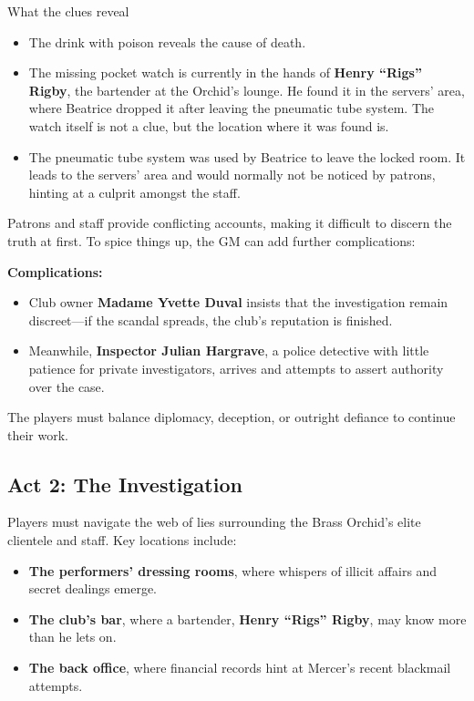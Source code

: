 \begin{DndComment}{What the clues reveal}
	\begin{itemize}
		\item The drink with poison reveals the cause of death.
		\item The missing pocket watch is currently in the hands of \textbf{Henry ``Rigs'' Rigby}, the bartender at the Orchid's lounge. He found it in the servers' area, where Beatrice dropped it after leaving the pneumatic tube system. The watch itself is not a clue, but the location where it was found is.
		\item The pneumatic tube system was used by Beatrice to leave the locked room. It leads to the servers' area and would normally not be noticed by patrons, hinting at a culprit amongst the staff.
	\end{itemize}
\end{DndComment}


Patrons and staff provide conflicting accounts, making it difficult to discern the truth at first. To spice things up, the GM can add further complications:
\begin{DndReadAloud}{\textbf{Complications:}}
	\begin{itemize}
		\item Club owner \textbf{Madame Yvette Duval} insists that the investigation remain discreet—if the scandal spreads, the club’s reputation is finished. 
		\item Meanwhile, \textbf{Inspector Julian Hargrave}, a police detective with little patience for private investigators, arrives and attempts to assert authority over the case.
	\end{itemize}
	
	\noindent
	The players must balance diplomacy, deception, or outright defiance to continue their work.
\end{DndReadAloud}



\subsection{Act 2: The Investigation} 

Players must navigate the web of lies surrounding the Brass Orchid’s elite clientele and staff. Key locations include:
\begin{DndReadAloud}{}
	\begin{itemize}
		\item \textbf{The performers’ dressing rooms}, where whispers of illicit affairs and secret dealings emerge.
		\item \textbf{The club’s bar}, where a bartender, \textbf{Henry ``Rigs'' Rigby}, may know more than he lets on.
		\item \textbf{The back office}, where financial records hint at Mercer’s recent blackmail attempts.
	\end{itemize}
\end{DndReadAloud}


